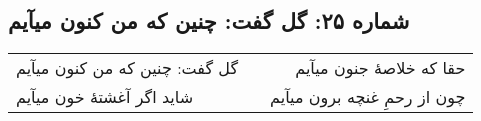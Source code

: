 \begin{center}
\section*{شماره ۲۵: گل گفت: چنین که من کنون میآیم}
\label{sec:025}
\begin{longtable}{l p{0.5cm} r}
گل گفت: چنین که من کنون میآیم
&&
حقا که خلاصهٔ جنون میآیم
\\
شاید اگر آغشتهٔ خون میآیم
&&
چون از رحمِ غنچه برون میآیم
\\
\end{longtable}
\end{center}
